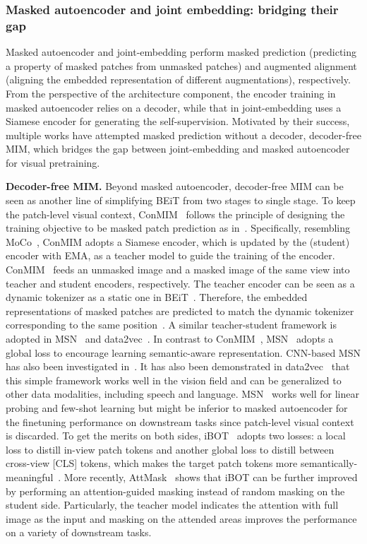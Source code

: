 \documentclass[10pt,journal,compsoc]{IEEEtran}
\begin{document}
\subsubsection{Masked autoencoder and joint embedding: bridging their gap}

Masked autoencoder and joint-embedding perform masked prediction (predicting a property of masked patches from unmasked patches) and augmented alignment (aligning the embedded representation of different augmentations), respectively. From the perspective of the architecture component, the encoder training in masked autoencoder relies on a decoder, while that in joint-embedding uses a Siamese encoder for generating the self-supervision. Motivated by their success, multiple works have attempted masked prediction without a decoder, decoder-free MIM, which bridges the gap between joint-embedding and masked autoencoder for visual pretraining. %

\textbf{Decoder-free MIM.} Beyond masked autoencoder, decoder-free MIM can be seen as another line of simplifying BEiT from two stages to single stage. To keep the patch-level visual context, ConMIM~\cite{yi2022masked} follows the principle of designing the training objective to be masked patch prediction as in~\cite{bao2022beit}. Specifically, resembling MoCo~\cite{he2020momentum,chen2021mocov3}, ConMIM adopts a Siamese encoder, which is updated by the (student) encoder with EMA, as a teacher model to guide the training of the encoder. ConMIM~\cite{yi2022masked} feeds an unmasked image and a masked image of the same view into teacher and student encoders, respectively. The teacher encoder can be seen as a dynamic tokenizer as a static one in BEiT~\cite{bao2022beit}. Therefore, the embedded representations of masked patches are predicted to match the dynamic tokenizer corresponding to the same position~\cite{yi2022masked}. A similar teacher-student framework is adopted in MSN~\cite{assran2022masked} and data2vec~\cite{baevski2022data2vec}. In contrast to ConMIM~\cite{yi2022masked}, MSN~\cite{assran2022masked} adopts a global loss to encourage learning semantic-aware representation. CNN-based MSN has also been investigated in~\cite{jing2022masked}. It has also been demonstrated in data2vec~\cite{baevski2022data2vec} that this simple framework works well in the vision field and can be generalized to other data modalities, including speech and language. MSN~\cite{assran2022masked} works well for linear probing and few-shot learning but might be inferior to masked autoencoder for the finetuning performance on downstream tasks since patch-level visual context is discarded. To get the merits on both sides, iBOT~\cite{zhou2022ibot} adopts two losses: a local loss to distill in-view patch tokens and another global loss to distill between cross-view [CLS] tokens, which makes the target patch tokens more semantically-meaningful~\cite{zhou2022ibot}. More recently, AttMask~\cite{kakogeorgiou2022hide} shows that iBOT can be further improved by performing an attention-guided masking instead of random masking on the student side. Particularly, the teacher model indicates the attention with full image as the input and masking on the attended areas improves the performance on a variety of downstream tasks. 
\end{document}
